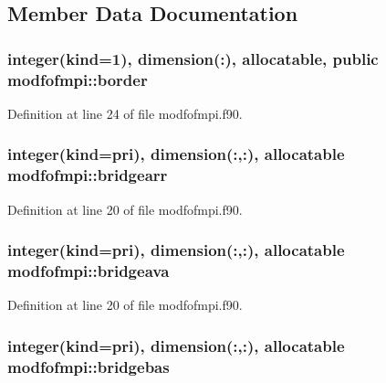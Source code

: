 \subsection{Member Data Documentation}
\hypertarget{classmodfofmpi_adb1afd2b26b96173f56ab37495e99e99}{
\subsubsection[{border}]{\setlength{\rightskip}{0pt plus 5cm}integer(kind=1), dimension(\-:), allocatable, public modfofmpi\-::border}}\label{classmodfofmpi_adb1afd2b26b96173f56ab37495e99e99}


Definition at line 24 of file modfofmpi.\-f90.

\hypertarget{classmodfofmpi_a3dffef2edd7b2899179cb3ffffd62430}{
\subsubsection[{bridgearr}]{\setlength{\rightskip}{0pt plus 5cm}integer(kind=pri), dimension(\-:,\-:), allocatable modfofmpi\-::bridgearr}}\label{classmodfofmpi_a3dffef2edd7b2899179cb3ffffd62430}


Definition at line 20 of file modfofmpi.\-f90.

\hypertarget{classmodfofmpi_a9891331c8f9f2ef3b5532b96129683ac}{
\subsubsection[{bridgeava}]{\setlength{\rightskip}{0pt plus 5cm}integer(kind=pri), dimension(\-:,\-:), allocatable modfofmpi\-::bridgeava}}\label{classmodfofmpi_a9891331c8f9f2ef3b5532b96129683ac}


Definition at line 20 of file modfofmpi.\-f90.

\hypertarget{classmodfofmpi_a2bdd3864a996f2afb8e49bbcdbd120e5}{
\subsubsection[{bridgebas}]{\setlength{\rightskip}{0pt plus 5cm}integer(kind=pri), dimension(\-:,\-:), allocatable modfofmpi\-::bridgebas}}\label{classmodfofmpi_a2bdd3864a996f2afb8e49bbcdbd120e5}


